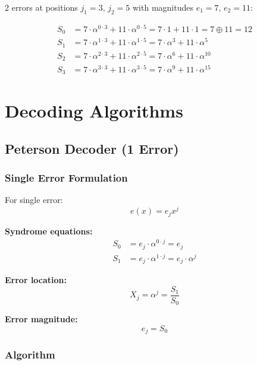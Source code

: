 \documentclass[11pt,a4paper]{article}
\begin{document}
2 errors at positions $j_1 = 3$, $j_2 = 5$ with magnitudes $e_1 = 7$, $e_2 = 11$:

\begin{align}
S_0 &= 7 \cdot \alpha^{0 \cdot 3} + 11 \cdot \alpha^{0 \cdot 5} = 7 \cdot 1 + 11 \cdot 1 = 7 \oplus 11 = 12 \\
S_1 &= 7 \cdot \alpha^{1 \cdot 3} + 11 \cdot \alpha^{1 \cdot 5} = 7 \cdot \alpha^3 + 11 \cdot \alpha^5 \\
S_2 &= 7 \cdot \alpha^{2 \cdot 3} + 11 \cdot \alpha^{2 \cdot 5} = 7 \cdot \alpha^6 + 11 \cdot \alpha^{10} \\
S_3 &= 7 \cdot \alpha^{3 \cdot 3} + 11 \cdot \alpha^{3 \cdot 5} = 7 \cdot \alpha^9 + 11 \cdot \alpha^{15}
\end{align}

\newpage
\section{Decoding Algorithms}

\subsection{Peterson Decoder (1 Error)}

\subsubsection{Single Error Formulation}

For single error:
\begin{equation}
e(x) = e_j x^j
\end{equation}

\textbf{Syndrome equations:}
\begin{align}
S_0 &= e_j \cdot \alpha^{0 \cdot j} = e_j \\
S_1 &= e_j \cdot \alpha^{1 \cdot j} = e_j \cdot \alpha^j
\end{align}

\textbf{Error location:}
\begin{equation}
X_j = \alpha^j = \frac{S_1}{S_0}
\end{equation}

\textbf{Error magnitude:}
\begin{equation}
e_j = S_0
\end{equation}

\subsubsection{Algorithm}
\end{document}
